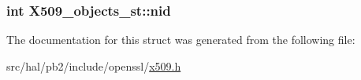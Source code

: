 \subsubsection[{\texorpdfstring{nid}{nid}}]{\setlength{\rightskip}{0pt plus 5cm}int X509\+\_\+objects\+\_\+st\+::nid}\hypertarget{struct_x509__objects__st_a8f3f79c1037e355813b601c2c9c4d019}{}\label{struct_x509__objects__st_a8f3f79c1037e355813b601c2c9c4d019}


The documentation for this struct was generated from the following file\+:\begin{DoxyCompactItemize}
\item 
src/hal/pb2/include/openssl/\hyperlink{x509_8h}{x509.\+h}\end{DoxyCompactItemize}

